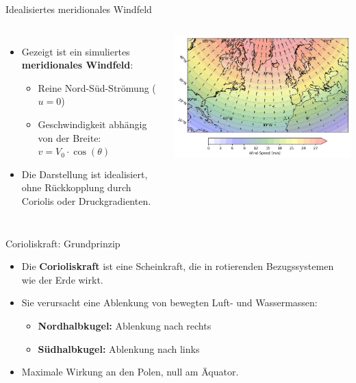 \begin{frame}{Idealisiertes meridionales Windfeld}
	\begin{columns}
		\begin{itemize}
			\item Gezeigt ist ein simuliertes \textbf{meridionales Windfeld}:
			      \begin{itemize}
				      \item Reine Nord-Süd-Strömung (\(u = 0\))
				      \item Geschwindigkeit abhängig von der Breite: \(v = V_0 \cdot \cos(\theta)\)
			      \end{itemize}
			\item Die Darstellung ist idealisiert, ohne Rückkopplung durch Coriolis oder Druckgradienten.
		\end{itemize}


		\includegraphics[width=\linewidth]{../images/meridional_wind_plot.png}

	\end{columns}
\end{frame}



\begin{frame}{Corioliskraft: Grundprinzip}
	\begin{itemize}
		\item Die \textbf{Corioliskraft} ist eine Scheinkraft, die in rotierenden Bezugssystemen wie der Erde wirkt.
		\item Sie verursacht eine Ablenkung von bewegten Luft- und Wassermassen:
		      \begin{itemize}
			      \item \textbf{Nordhalbkugel:} Ablenkung nach rechts
			      \item \textbf{Südhalbkugel:} Ablenkung nach links
		      \end{itemize}
		\item Maximale Wirkung an den Polen, null am Äquator.
	\end{itemize}
\end{frame}

